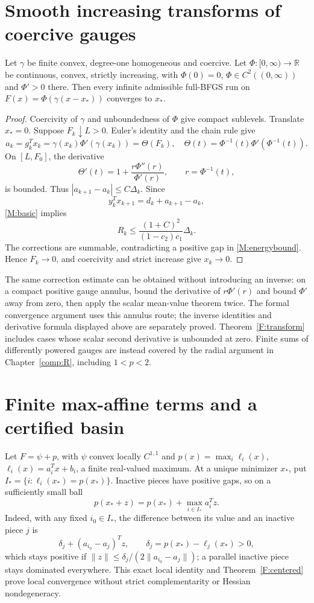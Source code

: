 \section{Smooth increasing transforms of coercive gauges}
\begin{theorem}\label{F:transform}
Let $\gamma$ be finite convex, degree-one homogeneous and coercive. Let $\Phi:[0,\infty)\to\mathbb R$ be continuous, convex, strictly increasing, with $\Phi(0)=0$, $\Phi\in C^2((0,\infty))$ and $\Phi'>0$ there. Then every infinite admissible full-BFGS run on $F(x)=\Phi(\gamma(x-x_*))$ converges to $x_*$.
\end{theorem}
\begin{proof}
Coercivity of $\gamma$ and unboundedness of $\Phi$ give compact sublevels. Translate $x_*=0$. Suppose $F_k\downarrow L>0$. Euler's identity and the chain rule give
\[
 a_k=g_k^Tx_k=\gamma(x_k)\Phi'(\gamma(x_k))=\Theta(F_k),
\quad\Theta(t)=\Phi^{-1}(t)\Phi'(\Phi^{-1}(t)).
\]
On $[L,F_0]$, the derivative
\[
 \Theta'(t)=1+\frac{r\Phi''(r)}{\Phi'(r)},\qquad r=\Phi^{-1}(t),
\]
is bounded. Thus $|a_{k+1}-a_k|\le C\Delta_k$. Since
\[
 y_k^Tx_{k+1}=d_k+a_{k+1}-a_k,
\]
\eqref{M:basic} implies
\[
 R_k\le\frac{(1+C)^2}{(1-c_2)c_1}\Delta_k.
\]
The corrections are summable, contradicting a positive gap in \eqref{M:energybound}. Hence $F_k\to0$, and coercivity and strict increase give $x_k\to0$.
\end{proof}
The same correction estimate can be obtained without introducing an inverse: on a compact positive gauge annulus, bound the derivative of $r\Phi'(r)$ and bound $\Phi'$ away from zero, then apply the scalar mean-value theorem twice. The formal convergence argument uses this annulus route; the inverse identities and derivative formula displayed above are separately proved. Theorem~\ref{F:transform} includes cases whose scalar second derivative is unbounded at zero. Finite sums of differently powered gauges are instead covered by the radial argument in Chapter~\ref{comp:R}, including $1<p<2$.



\section{Finite max-affine terms and a certified basin}
Let $F=\psi+p$, with $\psi$ convex locally $C^{1,1}$ and $p(x)=\max_i\ell_i(x)$, $\ell_i(x)=a_i^Tx+b_i$, a finite real-valued maximum. At a unique minimizer $x_*$, put $I_*=\{i:\ell_i(x_*)=p(x_*)\}$. Inactive pieces have positive gaps, so on a sufficiently small ball
\begin{equation}\label{F:active}
 p(x_*+z)=p(x_*)+\max_{i\in I_*}a_i^Tz.
\end{equation}
Indeed, with any fixed $i_0\in I_*$, the difference between its value and an inactive piece $j$ is
\[
 \delta_j+(a_{i_0}-a_j)^Tz,\qquad \delta_j=p(x_*)-\ell_j(x_*)>0,
\]
which stays positive if $\|z\|\le\delta_j/(2\|a_{i_0}-a_j\|)$; a parallel inactive piece stays dominated everywhere. This exact local identity and Theorem~\ref{F:centered} prove local convergence without strict complementarity or Hessian nondegeneracy.

